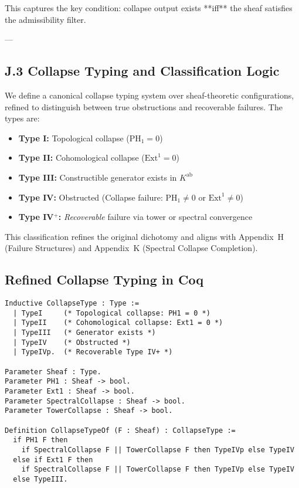 \documentclass[11pt]{article}
\begin{document}
This captures the key condition: collapse output exists **iff** the sheaf satisfies the admissibility filter.

---

\subsection*{J.3 Collapse Typing and Classification Logic}

We define a canonical collapse typing system over sheaf-theoretic configurations, refined to distinguish between true obstructions and recoverable failures.  
The types are:

\begin{itemize}
  \item \textbf{Type I:} Topological collapse (\( \mathrm{PH}_1 = 0 \))
  \item \textbf{Type II:} Cohomological collapse (\( \mathrm{Ext}^1 = 0 \))
  \item \textbf{Type III:} Constructible generator exists in \( K^{\mathrm{ab}} \)
  \item \textbf{Type IV:} Obstructed (Collapse failure: \( \mathrm{PH}_1 \ne 0 \) or \( \mathrm{Ext}^1 \ne 0 \))
  \item \textbf{Type IV$^+$:} \emph{Recoverable} failure via tower or spectral convergence
\end{itemize}

This classification refines the original dichotomy and aligns with Appendix~H (Failure Structures) and Appendix~K (Spectral Collapse Completion).

\medskip

\subsection*{Refined Collapse Typing in Coq}

\begin{lstlisting}[language=Coq, captionpos=b, caption={Coq: Refined Collapse Typing System}]
Inductive CollapseType : Type :=
  | TypeI     (* Topological collapse: PH1 = 0 *)
  | TypeII    (* Cohomological collapse: Ext1 = 0 *)
  | TypeIII   (* Generator exists *)
  | TypeIV    (* Obstructed *)
  | TypeIVp.  (* Recoverable Type IV+ *)

Parameter Sheaf : Type.
Parameter PH1 : Sheaf -> bool.
Parameter Ext1 : Sheaf -> bool.
Parameter SpectralCollapse : Sheaf -> bool.
Parameter TowerCollapse : Sheaf -> bool.

Definition CollapseTypeOf (F : Sheaf) : CollapseType :=
  if PH1 F then
    if SpectralCollapse F || TowerCollapse F then TypeIVp else TypeIV
  else if Ext1 F then
    if SpectralCollapse F || TowerCollapse F then TypeIVp else TypeIV
  else TypeIII.
\end{lstlisting}
\end{document}
